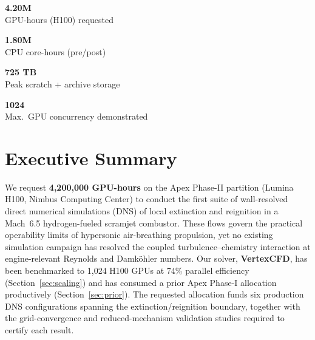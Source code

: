\documentclass[11pt,a4paper]{scrartcl}
\newcommand{\statitem}[3]{%
  {\color{apexteal}\Large #1}\quad
  {\color{meridianblue}\bfseries\Large #2}\\[1pt]
  {\small\color{gray!70!black} #3}
}
\begin{document}
\noindent
\begin{minipage}[t]{0.245\linewidth}
\begin{statbox}{}{}
\statitem{\faRocket}{4.20M}{GPU-hours (H100) requested}
\end{statbox}
\end{minipage}\hfill
\begin{minipage}[t]{0.245\linewidth}
\begin{statbox}{}{}
\statitem{\faMicrochip}{1.80M}{CPU core-hours (pre/post)}
\end{statbox}
\end{minipage}\hfill
\begin{minipage}[t]{0.245\linewidth}
\begin{statbox}{}{}
\statitem{\faDatabase}{725 TB}{Peak scratch + archive storage}
\end{statbox}
\end{minipage}\hfill
\begin{minipage}[t]{0.245\linewidth}
\begin{statbox}{}{}
\statitem{\faChartLine}{1024}{Max.\ GPU concurrency demonstrated}
\end{statbox}
\end{minipage}
\par
\vspace{8pt}

\section*{Executive Summary}
\begin{tcolorbox}[colback=cloudgray,colframe=meridianblue,boxrule=0.5pt,arc=1.5mm,left=10pt,right=10pt,top=8pt,bottom=8pt]
We request \textbf{4,200,000 GPU-hours} on the Apex Phase-II partition (Lumina H100, Nimbus Computing Center) to conduct the first suite of wall-resolved direct numerical simulations (DNS) of local extinction and reignition in a Mach~6.5 hydrogen-fueled scramjet combustor. These flows govern the practical operability limits of hypersonic air-breathing propulsion, yet no existing simulation campaign has resolved the coupled turbulence--chemistry interaction at engine-relevant Reynolds and Damk\"ohler numbers. Our solver, \textbf{VertexCFD}, has been benchmarked to 1{,}024 H100 GPUs at 74\% parallel efficiency (Section~\ref{sec:scaling}) and has consumed a prior Apex Phase-I allocation productively (Section~\ref{sec:prior}). The requested allocation funds six production DNS configurations spanning the extinction/reignition boundary, together with the grid-convergence and reduced-mechanism validation studies required to certify each result.
\end{tcolorbox}
\end{document}
